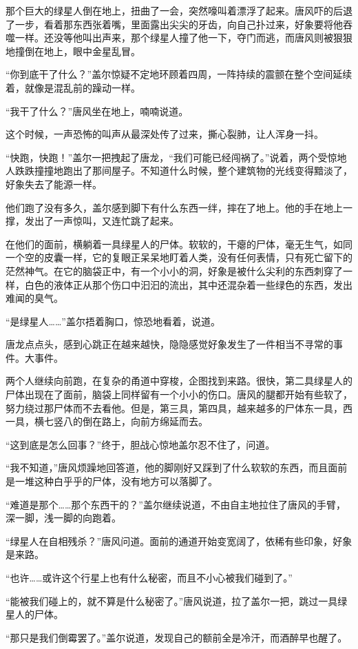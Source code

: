 那个巨大的绿星人倒在地上，扭曲了一会，突然嚎叫着漂浮了起来。唐风吓的后退了一步，看着那东西张着嘴，里面露出尖尖的牙齿，向自己扑过来，好象要将他吞噬一样。还没等他叫出声来，那个绿星人撞了他一下，夺门而逃，而唐风则被狠狠地撞倒在地上，眼中金星乱冒。

“你到底干了什么？”盖尔惊疑不定地环顾着四周，一阵持续的震颤在整个空间延续着，就像是混乱前的躁动一样。

“我干了什么？”唐风坐在地上，喃喃说道。

这个时候，一声恐怖的叫声从最深处传了过来，撕心裂肺，让人浑身一抖。

“快跑，快跑！”盖尔一把拽起了唐龙，“我们可能已经闯祸了。”说着，两个受惊地人跌跌撞撞地跑出了那间屋子。不知道什么时候，整个建筑物的光线变得黯淡了，好象失去了能源一样。

他们跑了没有多久，盖尔感到脚下有什么东西一绊，摔在了地上。他的手在地上一撑，发出了一声惊叫，又连忙跳了起来。

在他们的面前，横躺着一具绿星人的尸体。软软的，干瘪的尸体，毫无生气，如同一个空的皮囊一样，它的复眼正呆呆地盯着人类，没有任何表情，只有死亡留下的茫然神气。在它的脑袋正中，有一个小小的洞，好象是被什么尖利的东西刺穿了一样，白色的液体正从那个伤口中汩汩的流出，其中还混杂着一些绿色的东西，发出难闻的臭气。

“是绿星人……”盖尔捂着胸口，惊恐地看着，说道。

唐龙点点头，感到心跳正在越来越快，隐隐感觉好象发生了一件相当不寻常的事件。大事件。

两个人继续向前跑，在复杂的甬道中穿梭，企图找到来路。很快，第二具绿星人的尸体出现在了面前，脑袋上同样留有一个小小的伤口。唐风的腿都开始有些软了，努力绕过那尸体而不去看他。但是，第三具，第四具，越来越多的尸体东一具，西一具，横七竖八的倒在路上，向前方绵延而去。

“这到底是怎么回事？”终于，胆战心惊地盖尔忍不住了，问道。

“我不知道，”唐风烦躁地回答道，他的脚刚好又踩到了什么软软的东西，而且面前是一堆这种白乎乎的尸体，没有地方可以落脚了。

“难道是那个……那个东西干的？”盖尔继续说道，不由自主地拉住了唐风的手臂，深一脚，浅一脚的向跑着。

“绿星人在自相残杀？”唐风问道。面前的通道开始变宽阔了，依稀有些印象，好象是来路。

“也许……或许这个行星上也有什么秘密，而且不小心被我们碰到了。”

“能被我们碰上的，就不算是什么秘密了。”唐风说道，拉了盖尔一把，跳过一具绿星人的尸体。

“那只是我们倒霉罢了。”盖尔说道，发现自己的额前全是冷汗，而酒醉早也醒了。

